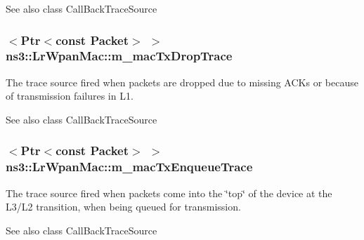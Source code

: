 \begin{DoxySeeAlso}{See also}
class Call\+Back\+Trace\+Source 
\end{DoxySeeAlso}
\subsubsection[{\texorpdfstring{m\+\_\+mac\+Tx\+Drop\+Trace}{m_macTxDropTrace}}]{$<${\bf Ptr}$<$const {\bf Packet}$>$ $>$ ns3\+::\+Lr\+Wpan\+Mac\+::m\+\_\+mac\+Tx\+Drop\+Trace\hspace{0.3cm}{\ttfamily [private]}}\hypertarget{classns3_1_1LrWpanMac_a3ff373bbe119ee781fda57327163b43a}{}\label{classns3_1_1LrWpanMac_a3ff373bbe119ee781fda57327163b43a}
The trace source fired when packets are dropped due to missing A\+C\+Ks or because of transmission failures in L1.

\begin{DoxySeeAlso}{See also}
class Call\+Back\+Trace\+Source 
\end{DoxySeeAlso}
\subsubsection[{\texorpdfstring{m\+\_\+mac\+Tx\+Enqueue\+Trace}{m_macTxEnqueueTrace}}]{$<${\bf Ptr}$<$const {\bf Packet}$>$ $>$ ns3\+::\+Lr\+Wpan\+Mac\+::m\+\_\+mac\+Tx\+Enqueue\+Trace\hspace{0.3cm}{\ttfamily [private]}}\hypertarget{classns3_1_1LrWpanMac_ab5d97c9ba008e159e541ec27df3480ea}{}\label{classns3_1_1LrWpanMac_ab5d97c9ba008e159e541ec27df3480ea}
The trace source fired when packets come into the \char`\"{}top\char`\"{} of the device at the L3/\+L2 transition, when being queued for transmission.

\begin{DoxySeeAlso}{See also}
class Call\+Back\+Trace\+Source 
\end{DoxySeeAlso}
